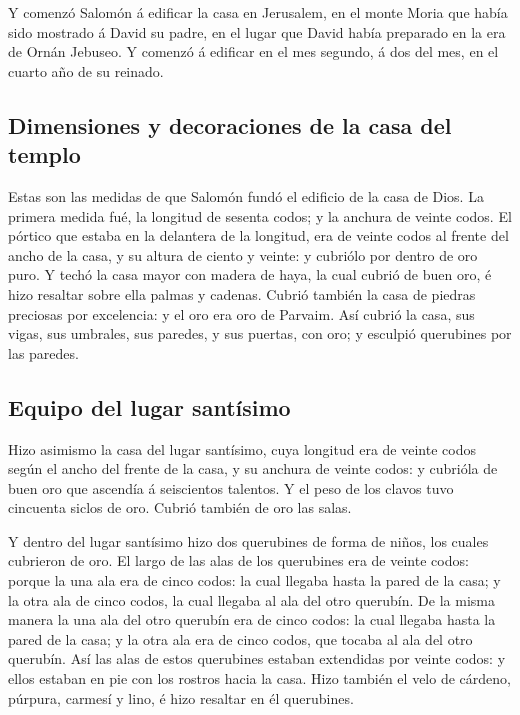  Y comenzó Salomón á edificar la casa en Jerusalem, en el
monte Moria que había sido mostrado á David su padre, en el lugar que
David había preparado en la era de Ornán Jebuseo.  Y
comenzó á edificar en el mes segundo, á dos del mes, en el cuarto año de
su reinado.

\hypertarget{dimensiones-y-decoraciones-de-la-casa-del-templo}{%
\subsection{Dimensiones y decoraciones de la casa del
templo}\label{dimensiones-y-decoraciones-de-la-casa-del-templo}}

 Estas son las medidas de que Salomón fundó el edificio de
la casa de Dios. La primera medida fué, la longitud de sesenta codos; y
la anchura de veinte codos.  El pórtico que estaba en la
delantera de la longitud, era de veinte codos al frente del ancho de la
casa, y su altura de ciento y veinte: y cubriólo por dentro de oro puro.
 Y techó la casa mayor con madera de haya, la cual cubrió
de buen oro, é hizo resaltar sobre ella palmas y cadenas. 
Cubrió también la casa de piedras preciosas por excelencia: y el oro era
oro de Parvaim.  Así cubrió la casa, sus vigas, sus
umbrales, sus paredes, y sus puertas, con oro; y esculpió querubines por
las paredes.

\hypertarget{equipo-del-lugar-santuxedsimo}{%
\subsection{Equipo del lugar
santísimo}\label{equipo-del-lugar-santuxedsimo}}

 Hizo asimismo la casa del lugar santísimo, cuya longitud
era de veinte codos según el ancho del frente de la casa, y su anchura
de veinte codos: y cubrióla de buen oro que ascendía á seiscientos
talentos.  Y el peso de los clavos tuvo cincuenta siclos
de oro. Cubrió también de oro las salas.

 Y dentro del lugar santísimo hizo dos querubines de
forma de niños, los cuales cubrieron de oro.  El largo de
las alas de los querubines era de veinte codos: porque la una ala era de
cinco codos: la cual llegaba hasta la pared de la casa; y la otra ala de
cinco codos, la cual llegaba al ala del otro querubín. 
De la misma manera la una ala del otro querubín era de cinco codos: la
cual llegaba hasta la pared de la casa; y la otra ala era de cinco
codos, que tocaba al ala del otro querubín.  Así las alas
de estos querubines estaban extendidas por veinte codos: y ellos estaban
en pie con los rostros hacia la casa.  Hizo también el
velo de cárdeno, púrpura, carmesí y lino, é hizo resaltar en él
querubines.

